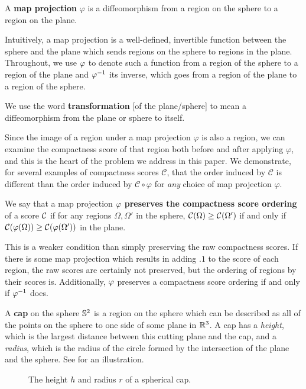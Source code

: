 \begin{definition}
  A \textbf{map projection} $\varphi$ is a 
  diffeomorphism from a region on the sphere to a region on the 
  plane. 
\end{definition}

Intuitively, a map projection is a well-defined, invertible function between the sphere and the plane which sends regions on the sphere to regions in the plane.  Throughout, we use $\varphi$ to denote such a function from a region of the sphere 
to a region of the plane and $\varphi^{-1}$ its inverse, which goes from a region of the plane to a region of the sphere. 

\begin{definition}
  We use the word \textbf{transformation} [of the plane/sphere] to mean
   a diffeomorphism from the plane or sphere to itself.
\end{definition}

Since the image of a region under a map projection $\varphi$ is also
a region, we can examine the compactness score of that region both 
before and after applying $\varphi$, and this is the heart of the
problem we address in this paper.  We demonstrate, for several
examples of compactness scores $\mathcal{C}$, that the order
induced by $\mathcal{C}$ is different than the order induced by
$\mathcal{C}\circ\varphi$ for \textit{any} choice of map projection
$\varphi$.

\begin{definition}
  We say that a map projection $\varphi$ \textbf{preserves the  
  compactness score ordering} of a score $\mathcal{C}$ if for any regions 
  $\Omega,\Omega'$ in the sphere, $\mathcal{C}(\Omega)\ge \mathcal{C}(\Omega')$ 
  if and only if $\mathcal{C}(\varphi(\Omega)) \ge \mathcal{C}(\varphi(\Omega'))$ in the plane.
\end{definition}

   This is a weaker condition than simply preserving the raw compactness scores. 
   If there is some map projection which results in adding $.1$ to the score of each region, the raw scores are certainly not preserved, but the ordering of regions by their scores is. Additionally, $\varphi$ preserves a compactness score ordering 
  if and only if $\varphi^{-1}$ does.



\begin{definition}
  A 
  \textbf{cap} on the sphere  $\mathbb{S}^2$ is a region on the sphere
 which can be described as all of the points on the sphere to one side of some plane 
 in $\mathbb{R}^3$.  A cap has a \textit{height}, which is the largest distance between this cutting plane and the cap, and a \textit{radius}, which is the radius of the circle formed by the intersection of the plane and the sphere.  See  for an illustration.
\end{definition}


\begin{figure}[h]
  \centering
  
  \caption{ The height $h$ and radius $r$ of a spherical cap. }
  \label{fig:caphr}
\end{figure}





